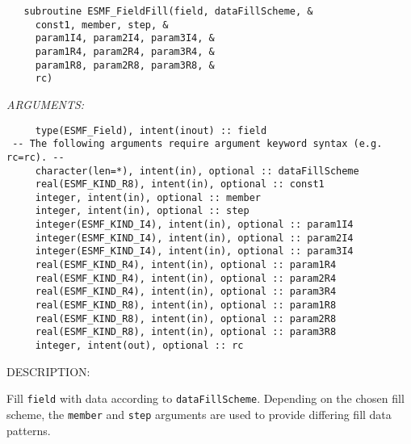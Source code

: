 \begin{verbatim}   subroutine ESMF_FieldFill(field, dataFillScheme, &
     const1, member, step, &
     param1I4, param2I4, param3I4, &
     param1R4, param2R4, param3R4, &
     param1R8, param2R8, param3R8, &
     rc)\end{verbatim}{\em ARGUMENTS:}
\begin{verbatim}     type(ESMF_Field), intent(inout) :: field
 -- The following arguments require argument keyword syntax (e.g. rc=rc). --
     character(len=*), intent(in), optional :: dataFillScheme
     real(ESMF_KIND_R8), intent(in), optional :: const1
     integer, intent(in), optional :: member
     integer, intent(in), optional :: step
     integer(ESMF_KIND_I4), intent(in), optional :: param1I4
     integer(ESMF_KIND_I4), intent(in), optional :: param2I4
     integer(ESMF_KIND_I4), intent(in), optional :: param3I4
     real(ESMF_KIND_R4), intent(in), optional :: param1R4
     real(ESMF_KIND_R4), intent(in), optional :: param2R4
     real(ESMF_KIND_R4), intent(in), optional :: param3R4
     real(ESMF_KIND_R8), intent(in), optional :: param1R8
     real(ESMF_KIND_R8), intent(in), optional :: param2R8
     real(ESMF_KIND_R8), intent(in), optional :: param3R8
     integer, intent(out), optional :: rc\end{verbatim}
{\sf DESCRIPTION:\\ }


   \label{ESMF_FieldFill}
   Fill {\tt field} with data according to {\tt dataFillScheme}. Depending
   on the chosen fill scheme, the {\tt member} and {\tt step} arguments are
   used to provide differing fill data patterns.
  
